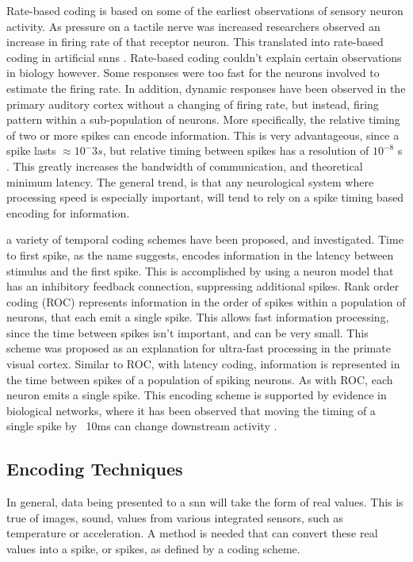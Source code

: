    Rate-based coding is based on some of the earliest observations of sensory
    neuron activity. As pressure on a tactile nerve was increased researchers
    observed an increase in firing rate of that receptor neuron. This translated
    into rate-based coding in artificial \glspl{snn}
    \parencite{ponulak_2011}. Rate-based coding couldn't explain certain
    observations in biology however. Some responses were too fast for the
    neurons involved to estimate the firing rate. In addition, dynamic responses
    have been observed in the primary auditory cortex without a changing of
    firing rate, but instead, firing pattern within a sub-population of
    neurons. More specifically, the relative timing of two or more spikes can
    encode information. This is very advantageous, since a spike lasts $\approx
    10^-3s$, but relative timing between spikes has a resolution of $10^{-8}$ s
    \parencite{ponulak_2011}. This greatly increases the bandwidth of
    communication, and theoretical minimum latency. The general trend, is that
    any neurological system where processing speed is especially important, will
    tend to rely on a spike timing based encoding for information.

    a variety of temporal coding schemes have been proposed, and
    investigated. Time to first spike, as the name suggests, encodes information
    in the latency between stimulus and the first spike. This is accomplished by
    using a neuron model that has an inhibitory feedback connection, suppressing
    additional spikes. Rank order coding (ROC) represents information in the
    order of spikes within a population of neurons, that each emit a single
    spike. This allows fast information processing, since the time between
    spikes isn't important, and can be very small. This scheme was proposed as
    an explanation for ultra-fast processing in the primate visual
    cortex. Similar to ROC, with latency coding, information is represented in
    the time between spikes of a population of spiking neurons. As with ROC,
    each neuron emits a single spike. This encoding scheme is supported by
    evidence in biological networks, where it has been observed that moving the
    timing of a  single spike by ~10ms can change downstream activity
    \parencite{ponulak_2011}.
        
    \subsection{Encoding Techniques}
    In general, data being presented to a \gls{snn} will take the form of real
    values. This is true of images, sound, values from various integrated
    sensors, such as temperature or acceleration. A method is needed that can
    convert these real values into a spike, or spikes, as defined by a coding
    scheme.
    
